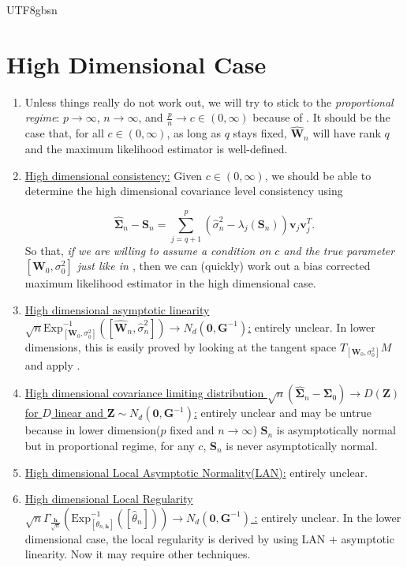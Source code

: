 \documentclass[12pt]{report}
\newcommand{\bracket}[1]{\left ( #1 \right )}
\newcommand{\squared}[1]{\left [ #1 \right ]}
\theoremstyle{plain}
\theoremstyle{definition}
\begin{document}
\begin{CJK*}{UTF8}{gbsn}
\section{High Dimensional Case}

\begin{enumerate}
  \item Unless things really do not work out, 
  we will try to stick to the \textit{proportional regime}: 
  $p \to \infty$, $n \to \infty$, and $\frac{p}{n} \to c \in (0, \infty)$
  because of \cite{Passemier_Li_Yao_2017}.
  It should be the case that, for all $c \in (0, \infty)$, as long as $q$ stays fixed,
  $\hat{\bm{W}}_n$ will have rank $q$ and the maximum likelihood estimator is well-defined.
  \item \underline{High dimensional consistency:}
  Given $c \in (0, \infty)$, we should be able to determine the high dimensional covariance level consistency using 
  
  \begin{equation*}
\hat{\bm{\Sigma}}_n-\bm{S}_n = \sum_{j=q+1}^p \bracket{\hat{\sigma}_n^2-\lambda_j(\bm{S}_n)} \bm{v}_j\bm{v}_j^T.
\end{equation*}
  So that, \textit{if we are willing to assume a condition on 
  $c$ and the true parameter $[\bm{W}_0, \sigma_0^2]$ just like in \cite{Passemier_Li_Yao_2017}},
  then we can (quickly) work out a bias corrected maximum likelihood estimator in the high dimensional case.
  \item \underline{High dimensional asymptotic linearity 
  $\sqrt{n} \text{Exp}^{-1}_{[\bm{W}_0, \sigma_0^2]}\bracket{\squared{\hat{\bm{W}}_n, \hat{\sigma}_n^2}}
  \to N_d(\bm{0}, \bm{G}^{-1})$:} entirely unclear.
  In lower dimensions, this is easily proved by looking at the tangent space $T_{[\bm{W}_0, \sigma_0^2]}M$
  and apply \cite{van_der_Vaart_1998}.
  \item \underline{High dimensional covariance limiting distribution
  $\sqrt{n} (\hat{\bm{\Sigma}}_n- \bm{\Sigma}_0) \to D(\bm{Z})$ for $D$ linear and $\bm{Z} \sim N_d(\bm{0}, \bm{G}^{-1})$:} entirely unclear
  and may be untrue because in lower dimension($p$ fixed and $n \to \infty$) $\bm{S}_n$ is asymptotically normal 
  but in proportional regime, for any $c$, $\bm{S}_n$ is never asymptotically normal.
  \item \underline{High dimensional Local Asymptotic Normality(LAN):} entirely unclear.
  \item \underline{High dimensional Local Regularity $\sqrt{n} \Gamma_{\frac{\bm{h}}{\sqrt{n}}} \bracket{\text{Exp}^{-1}_{
    \squared{\theta_{n, \bm{h}}}}\bracket{\squared{\hat{\theta}_n}}}
    \to N_d \bracket{\bm{0}, \bm{G}^{-1}}$ :} entirely unclear.
    In the lower dimensional case, the local regularity is derived by using LAN $+$ asymptotic linearity.
    Now it may require other techniques.
\end{enumerate}


\end{CJK*}
\end{document}

